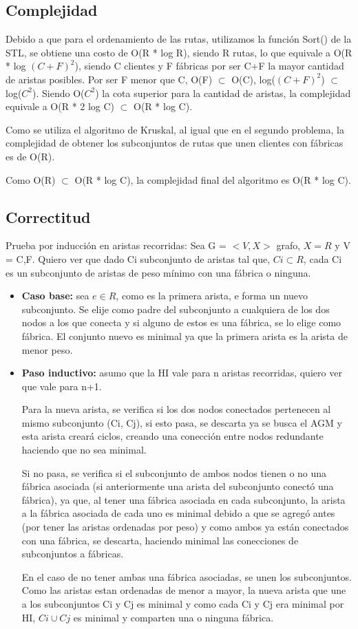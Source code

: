 \documentclass[a4paper, 10pt, twoside]{article}
\begin{document}
\subsection{Complejidad}
Debido a que para el ordenamiento de las rutas, utilizamos la función Sort() de la STL, se obtiene una costo de O(R * log R), siendo R rutas, lo que equivale a O(R * log $(C+F)^2$), siendo C clientes y F fábricas por ser C+F la mayor cantidad de aristas posibles. Por ser F menor que C, O(F) $\subset$ O(C), log($(C+F)^2$) $\subset$ log($C^2$). Siendo O($C^2$) la cota superior para la cantidad de aristas, la complejidad equivale a O(R * 2 log C) $\subset$ O(R * log C).

Como se utiliza el algoritmo de Kruskal, al igual que en el segundo problema, la complejidad de obtener los subconjuntos de rutas que unen clientes con fábricas es de O(R).

Como O(R) $\subset$ O(R * log C), la complejidad final del algoritmo es O(R * log C).
\subsection{Correctitud}
Prueba por inducción en aristas recorridas:
Sea G = $<V,X>$ grafo, $X = R$ y V = {C,F}. Quiero ver que dado Ci subconjunto de aristas tal que, $Ci \subset R$, cada Ci es un subconjunto de aristas de peso mínimo con una fábrica o ninguna. 
\begin{itemize}
	\item \textbf{Caso base:} sea $e \in R$, como es la primera arista, e forma un nuevo subconjunto. Se elije como padre del subconjunto a cualquiera de los  dos nodos a los que conecta y si alguno de estos es una fábrica, se lo elige como fábrica. El conjunto nuevo es minimal ya que la primera arista es la arista de menor peso.
	\item \textbf{Paso inductivo:} asumo que la HI vale para n aristas recorridas, quiero ver que vale para n+1.
	
Para la nueva arista, se verifica si los dos nodos conectados pertenecen al mismo subconjunto (Ci, Cj), si esto pasa, se descarta ya se busca el AGM y esta arista creará ciclos, creando una conección entre nodos redundante haciendo que no sea minimal.
	
Si no pasa, se verifica si el subconjunto de ambos nodos tienen o no una fábrica asociada (si anteriormente una arista del subconjunto conectó una fábrica), ya que, al tener una fábrica asociada en cada subconjunto, la arista a la fábrica asociada de cada uno es minimal debido a que se agregó antes (por tener las aristas ordenadas por peso) y como ambos ya están conectados con una fábrica, se descarta, haciendo minimal las conecciones de subconjuntos a fábricas.

En el caso de no tener ambas una fábrica asociadas, se unen los subconjuntos. Como las aristas estan ordenadas de menor a mayor, la nueva arista que une a los subconjuntos Ci y Cj es minimal y como cada Ci y Cj era minimal por HI, $Ci \cup Cj$ es minimal y comparten una o ninguna fábrica.

\end{itemize}
\end{document}
